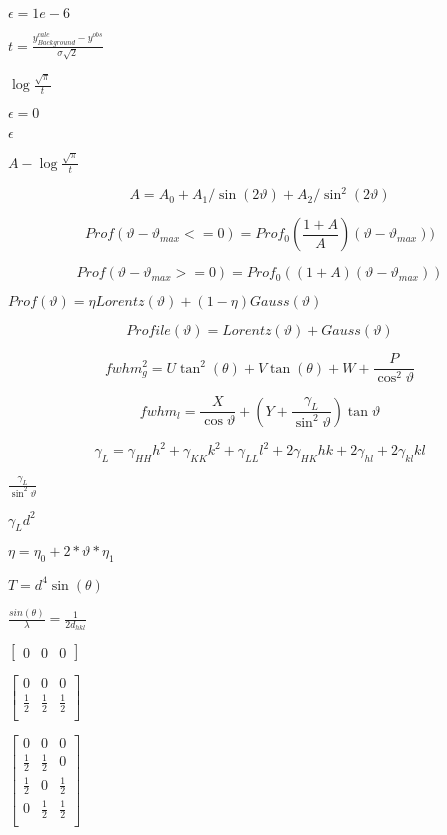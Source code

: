 \documentclass{article}
\begin{document}
$\epsilon = 1e-6$
\pagebreak

$ t = \frac{y^{calc}_{Background}-y^{obs}}{\sigma\sqrt{2}}$
\pagebreak

$ \log{\frac{\sqrt{\pi}}{t}}$
\pagebreak

$\epsilon=0$
\pagebreak

$\epsilon$
\pagebreak

$A-\log{\frac{\sqrt{\pi}}{t}}$
\pagebreak

\[ A=A_0+A_1/\sin(2\vartheta)+A_2/\sin^2(2\vartheta) \]
\pagebreak

\[ Prof(\vartheta-\vartheta_{max}<=0)=Prof_0(\frac{1+A}{A})(\vartheta-\vartheta_{max})) \]
\pagebreak

\[ Prof(\vartheta-\vartheta_{max}>=0)=Prof_0((1+A) (\vartheta-\vartheta_{max})) \]
\pagebreak

$ Prof(\vartheta) = \eta Lorentz(\vartheta) + (1-\eta) Gauss(\vartheta) $
\pagebreak

\[ Profile(\vartheta)= Lorentz(\vartheta) + Gauss(\vartheta)\]
\pagebreak

\[ fwhm_g^2= U \tan^2(\theta) + V \tan(\theta) +W +\frac{P}{\cos^2\vartheta} \]
\pagebreak

\[ fwhm_l= \frac{X}{\cos\vartheta} +(Y + \frac{\gamma_L}{\sin^2\vartheta})\tan\vartheta \]
\pagebreak

\[ \gamma_L = \gamma_{HH}h^2 + \gamma_{KK}k^2 + \gamma_{LL}l^2 + 2\gamma_{HK}hk + 2\gamma_{hl} + 2\gamma_{kl}kl\]
\pagebreak

$ \frac{\gamma_L}{\sin^2\vartheta} $
\pagebreak

$ \gamma_L d^2 $
\pagebreak

$ \eta=\eta_0 +2*\vartheta*\eta_1$
\pagebreak

$ T = d^4\sin(\theta) $
\pagebreak

$ \frac{sin(\theta)}{\lambda} = \frac{1}{2d_{hkl}}$
\pagebreak

$ \left[ \begin {array}{ccc} 0 & 0 & 0 \end{array} \right] $
\pagebreak

$ \left[ \begin {array}{ccc} 0 & 0 & 0 \\ \frac{1}{2} & \frac{1}{2} & \frac{1}{2} \\ \end{array} \right] $
\pagebreak

$ \left[ \begin {array}{ccc} 0 & 0 & 0 \\ \frac{1}{2} & \frac{1}{2} & 0 \\ \frac{1}{2} & 0 & \frac{1}{2} \\ 0 & \frac{1}{2} & \frac{1}{2} \\ \end{array} \right] $
\pagebreak
\end{document}
